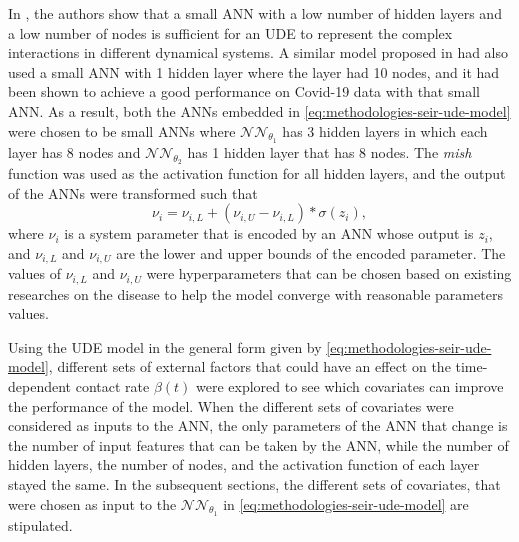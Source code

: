 In \cite{rackauckasUniversalDifferentialEquations2020}, the authors show that a small \gls{ANN} with a low number of hidden layers and a low number of nodes is sufficient for an \gls{UDE} to represent the complex interactions in different dynamical systems.
A similar model proposed in \cite{dandekarMachineLearningAidedGlobal2020a} had also used a small \gls{ANN} with 1 hidden layer where the layer had 10 nodes, and it had been shown to achieve a good performance on Covid-19 data with that small \gls{ANN}.
As a result, both the \glspl{ANN} embedded in \autoref{eq:methodologies-seir-ude-model} were chosen to be small \glspl{ANN} where $\mathcal{NN}_{\theta_1}$ has 3 hidden layers in which each layer has 8 nodes and $\mathcal{NN}_{\theta_2}$ has 1 hidden layer that has 8 nodes.
The \textit{mish} function \cite{misraMishSelfRegularized2020} was used as the activation function for all hidden layers, and the output of the \glspl{ANN} were transformed such that
\begin{equation*}
    \nu_i = \nu_{i,L} + (\nu_{i,U} - \nu_{i,L}) * \sigma (z_i),
\end{equation*}
where $\nu_i$ is a system parameter that is encoded by an \gls{ANN} whose output is $z_i$, and $\nu_{i,L}$ and $\nu_{i,U}$ are the lower and upper bounds of the encoded parameter.
The values of $\nu_{i,L}$ and $\nu_{i,U}$ were hyperparameters that can be chosen based on existing researches on the disease to help the model converge with reasonable parameters values.

Using the \gls{UDE} model in the general form given by \autoref{eq:methodologies-seir-ude-model}, different sets of external factors that could have an effect on the time-dependent contact rate $\beta (t)$ were explored to see which covariates can improve the performance of the model.
When the different sets of covariates were considered as inputs to the \gls{ANN}, the only parameters of the \gls{ANN} that change is the number of input features that can be taken by the \gls{ANN}, while the number of hidden layers, the number of nodes, and the activation function of each layer stayed the same.
In the subsequent sections, the different sets of covariates, that were chosen as input to the $\mathcal{NN}_{\theta_1}$ in \autoref{eq:methodologies-seir-ude-model} are stipulated.

